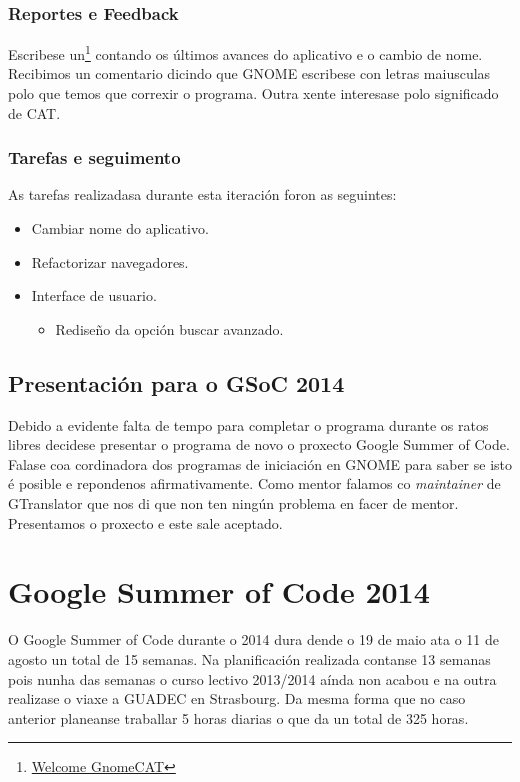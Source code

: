 \subsubsection{Reportes e Feedback}
Escribese un\footnote{\href{http://aquelando.info/welcome-gnomecat/}{Welcome GnomeCAT}} contando os últimos avances do aplicativo e o cambio de nome. Recibimos un comentario dicindo que GNOME escribese con letras maiusculas polo que temos que correxir o programa. Outra xente interesase polo significado de CAT.

\subsubsection{Tarefas e seguimento}

As tarefas realizadasa durante esta iteración foron as seguintes:

\begin{itemize}
  \item Cambiar nome do aplicativo.
  \item Refactorizar navegadores.
  \item Interface de usuario.
    \begin{itemize}
      \item Rediseño da opción buscar avanzado.
    \end{itemize}
\end{itemize}

\subsection{Presentación para o GSoC 2014}
Debido a evidente falta de tempo para completar o programa durante os ratos libres decidese presentar o programa de novo o proxecto Google Summer of Code. Falase coa cordinadora dos programas de iniciación en GNOME para saber se isto é posible e repondenos afirmativamente. Como mentor falamos co \emph{maintainer} de GTranslator que nos di que non ten ningún problema en facer de mentor. Presentamos o proxecto e este sale aceptado.

\section{Google Summer of Code 2014}
O Google Summer of Code durante o 2014 dura dende o 19 de maio ata o 11 de agosto un total de 15 semanas. Na planificación realizada contanse 13 semanas pois nunha das semanas o curso lectivo 2013/2014 aínda non acabou e na outra realizase o viaxe a GUADEC en Strasbourg. Da mesma forma que no caso anterior planeanse traballar 5 horas diarias o que da un total de 325 horas.

